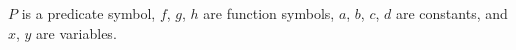 $P$ is a predicate symbol, $f$, $g$, $h$ are function symbols, $a$, $b$, $c$, $d$ are constants, and $x$, $y$ are variables.
